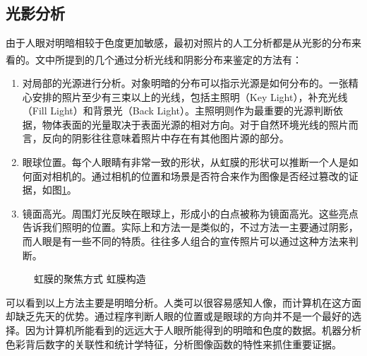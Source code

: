 \documentclass[a4paper, 10pt, notitlepage]{report}
\newcommand{\supercite}[1]{\textsuperscript{\cite{#1}}}
\begin{document}
		\subsection{光影分析}
		由于人眼对明暗相较于色度更加敏感，最初对照片的人工分析都是从光影的分布来看的。文\supercite{sa01}中所提到的几个通过分析光线和阴影分布来鉴定的方法有：
		\begin{enumerate}\setlength{\itemsep}{-0.1cm}
			\item 对局部的光源进行分析。对象明暗的分布可以指示光源是如何分布的。一张精心安排的照片至少有三束以上的光线，包括主照明（Key Light），补充光线（Fill Light）和背景光（Back Light）。主照明则作为最重要的光源判断依据，物体表面的光量取决于表面光源的相对方向。对于自然环境光线的照片而言，反向的阴影往往意味着照片中存在有其他图片源的部分。
			\item 眼球位置。每个人眼睛有非常一致的形状，从虹膜的形状可以推断一个人是如何面对相机的。通过相机的位置和场景是否符合来作为图像是否经过篡改的证据，如图\ref{fig-eye}。
			\item 镜面高光。周围灯光反映在眼球上，形成小的白点被称为镜面高光。这些亮点告诉我们照明的位置。实际上和方法一是类似的，不过方法一主要通过阴影，而人眼是有一些不同的特质。往往多人组合的宣传照片可以通过这种方法来判断。
		\end{enumerate}
			\begin{figure}[ht]
				\centering
				\caption{虹膜的聚焦方式 虹膜构造}
				\label{fig-eye}
			\end{figure}
		可以看到以上方法主要是明暗分析。人类可以很容易感知人像，而计算机在这方面却缺乏先天的优势。通过程序判断人眼的位置或是眼球的方向并不是一个最好的选择。因为计算机所能看到的远远大于人眼所能得到的明暗和色度的数据。机器分析色彩背后数字的关联性和统计学特征，分析图像函数的特性来抓住重要证据。
\end{document}
